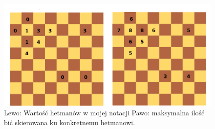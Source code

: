 \documentclass{article}
\begin{document}
\begin{figure}[!ht]
  \centering
      \includegraphics[scale=0.3]{obs1a.png}
  \caption{Lewo: Wartość hetmanów w mojej notacji Pawo: maksymalna ilość bić skierowana ku konkretnemu hetmanowi.}
\end{figure}
\end{document}

